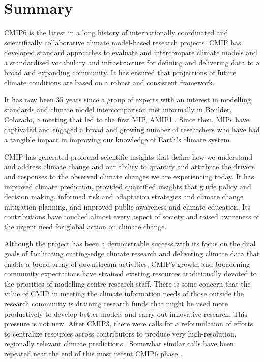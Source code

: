 \documentclass[manuscript]{copernicus}
\newcommand{\mycomment}[1]{}
\begin{document}
\mycomment{
MIP6Plus: Infrastructure concepts of multiverse/CMIP, planet/project, and continent/usernodes)
}


\section{Summary} %
\label{sec:Summary}

CMIP6 is the latest in a long history of internationally coordinated and scientifically collaborative climate model-based research projects. CMIP has developed standard approaches to evaluate and intercompare climate models and a standardised vocabulary and infrastructure for defining and delivering data to a broad and expanding community. It has ensured that projections of future climate conditions are based on a robust and consistent framework.

It has now been 35 years since a group of experts with an interest in modelling standards and climate model intercomparison met informally in Boulder, Colorado, a meeting that led to the first MIP, AMIP1 \citep{gates_amip_1991}. Since then, MIPs have captivated and engaged a broad and growing number of researchers who have had a tangible impact in improving our knowledge of Earth's climate system.

CMIP has generated profound scientific insights that define how we understand and address climate change and our ability to quantify and attribute the drivers and responses to the observed climate changes we are experiencing today. It has improved climate prediction, provided quantified insights that guide policy and decision making, informed risk and adaptation strategies and climate change mitigation planning, and improved public awareness and climate education. Its contributions have touched almost every aspect of society and raised awareness of the urgent need for global action on climate change.

Although the project has been a demonstrable success with its focus on the dual goals of facilitating cutting-edge climate research and delivering climate data that enable a broad array of downstream activities, CMIP's growth and broadening community expectations have strained existing resources traditionally devoted to the priorities of modelling centre research staff. There is some concern that the value of CMIP in meeting the climate information needs of those outside the research community is draining research funds that might be used more productively to develop better models and carry out innovative research. This pressure is not new. After CMIP3, there were calls for a reformulation of efforts to centralize resources across contributors to produce very high-resolution, regionally relevant climate predictions \citep{shukla_strategies_2009,shukla_toward_2010}. Somewhat similar calls have been repeated near the end of this most recent CMIP6 phase \citep{jakob_need_2023,stevens_perspective_2024}.
\end{document}
